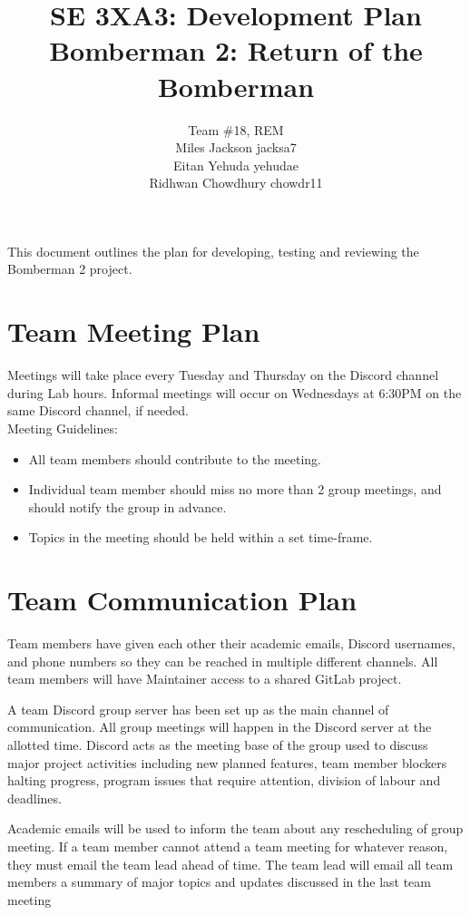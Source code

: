 \documentclass{article}
\title{SE 3XA3: Development Plan\\Bomberman 2: Return of the Bomberman}
\author{Team \#18, REM
		\\ Miles Jackson  jacksa7
		\\ Eitan Yehuda  yehudae
		\\ Ridhwan Chowdhury chowdr11
}
\date{}
\begin{document}
\maketitle



This document outlines the plan for developing, testing and reviewing the Bomberman 2
project.

\section{Team Meeting Plan}

Meetings will take place every Tuesday and Thursday on the Discord channel during Lab hours.
Informal meetings will occur on Wednesdays at 6:30PM on the same Discord channel, if needed. \\
\linebreak 
Meeting Guidelines:
\begin{itemize}
    \item All team members should contribute to the meeting.
    \item Individual team member should miss no more than 2 group meetings, and should notify the group in advance.
    \item Topics in the meeting should be held within a set time-frame.

\end{itemize}


\section{Team Communication Plan}

Team members have given each other their academic emails, Discord usernames, and phone numbers so they can be reached in multiple different channels. All team members will have Maintainer access to a shared GitLab project.

A team Discord group server has been set up as the main channel of communication. All group meetings will happen in the Discord server at the allotted time. Discord acts as the meeting base of the group used to discuss major project activities including new planned features, team member blockers halting progress, program issues that require attention, division of labour and deadlines.

Academic emails will be used to inform the team about any rescheduling of group meeting. If a team member cannot attend a team meeting for whatever reason, they must email the team lead ahead of time. The team lead will email all team members a summary of major topics and updates discussed in the last team meeting
\end{document}
